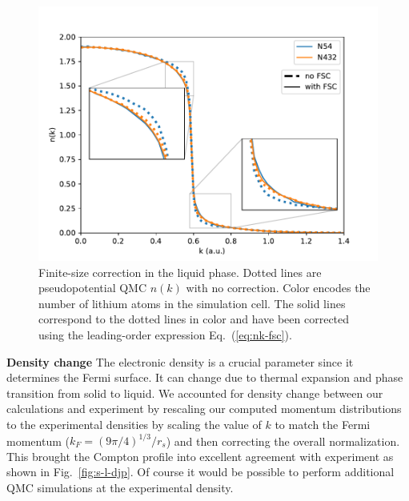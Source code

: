 \documentclass[aps,prb,showpacs,preprintnumbers,amsmath,amssymb,superscriptaddress,twocolumn]{revtex4-1}
\newcommand{\david}[1]{ \textcolor{red}{\textbf{DC: #1}}}
\begin{document}
\begin{figure}
\includegraphics[width=\linewidth]{li58h_liquid-fsc}
\caption{Finite-size correction in the liquid phase. Dotted lines are pseudopotential QMC $n(k)$ with no correction. Color encodes the number of lithium atoms in the simulation cell. The solid lines correspond to the dotted lines in color and have been corrected using the leading-order expression Eq.~(\ref{eq:nk-fsc}). \label{fig:liquid-nk-fsc}}
\end{figure}

{\bf Density change} The electronic density is a crucial parameter since it determines the Fermi surface. It can change due to thermal expansion and phase transition from solid to liquid.
We accounted for density change between our calculations and experiment by rescaling our computed momentum distributions to the experimental densities by scaling the value of $k$ to match the Fermi momentum ($k_F=(9\pi/4)^{1/3}/r_s$) and then correcting the overall normalization.
This brought the Compton profile into excellent agreement with experiment as shown in Fig.~\ref{fig:s-l-djp}.  Of course it would be possible to perform additional QMC simulations at the experimental density. %
\end{document}

